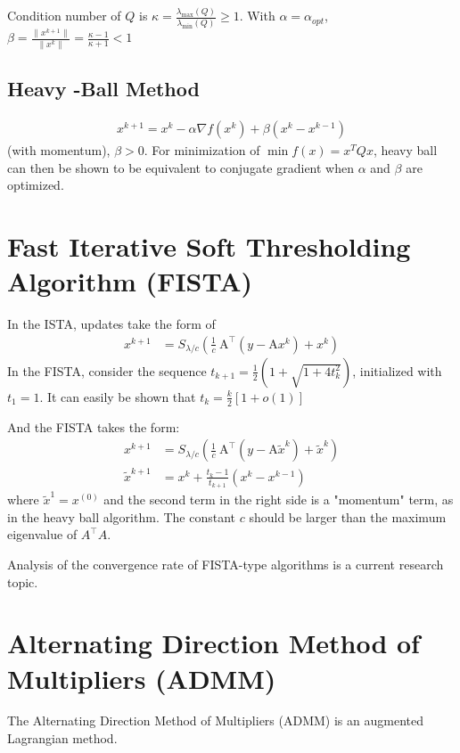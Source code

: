 \documentclass[11pt]{elegantbook}
\begin{document}
Condition number of $Q$ is $\kappa=\frac{\lambda_{\max}(Q)}{\lambda_{\min}(Q)}\geq 1$. With $\alpha=\alpha_{opt}$, $\beta=\frac{\|x^{k+1}\|}{\|x^k\|}=\frac{\kappa-1}{\kappa+1}<1$

\subsection*{Heavy -Ball Method}
\begin{equation}
    \begin{aligned}
        x^{k+1}=x^k-\alpha \nabla f(x^k)+\beta (x^k-x^{k-1})
    \end{aligned}
    \nonumber
\end{equation}
(with momentum), $\beta>0$.
For minimization of $\min f(x)=x^TQx$, heavy ball can then be shown to be equivalent to conjugate gradient when $\alpha$ and $\beta$ are optimized.

\section{Fast Iterative Soft Thresholding Algorithm (FISTA)}
In the ISTA, updates take the form of
\begin{equation}
    \begin{aligned}
        x^{k+1} &=S_{\lambda / c}\left(\frac{1}{c} \mathrm{~A}^{\top}\left(y-\mathrm{A} {x}^k\right)+{x}^k\right)
    \end{aligned}
    \nonumber
\end{equation}
In the FISTA, consider the sequence $t_{k+1}=\frac{1}{2}\left(1+\sqrt{1+4t_k^2}\right)$, initialized with $t_1=1$. It can easily be shown that $t_k=\frac{k}{2}[1+o(1)]$




And the FISTA takes the form:
$$
\begin{aligned}
x^{k+1} &=S_{\lambda / c}\left(\frac{1}{c} \mathrm{~A}^{\top}\left(y-\mathrm{A} \tilde{x}^k\right)+\tilde{x}^k\right) \\
\tilde{x}^{k+1} &=x^k+\frac{t_k-1}{t_{k+1}}\left(x^k-x^{k-1}\right)
\end{aligned}
$$
where $\tilde{x}^1=x^{(0)}$ and the second term in the right side is a "momentum" term, as in the heavy ball algorithm. The constant $c$ should be larger than the maximum eigenvalue of $A^{\top} A$.

Analysis of the convergence rate of FISTA-type algorithms is a current research topic.

\section{Alternating Direction Method of Multipliers (ADMM)}
The Alternating Direction Method of Multipliers (ADMM) is an augmented Lagrangian method.
\end{document}
